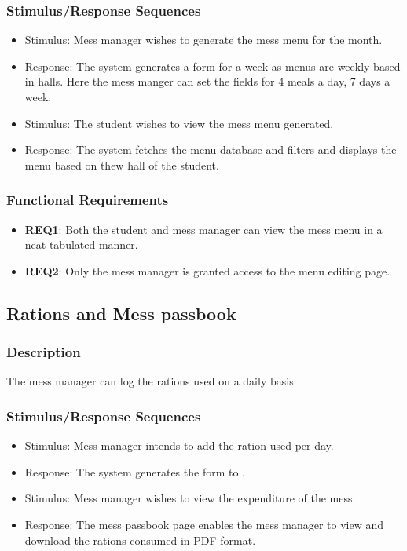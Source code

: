 \documentclass{scrreprt}
\begin{document}
\subsubsection{Stimulus/Response Sequences}
\begin{itemize}
    \item Stimulus: Mess manager wishes to generate the mess menu for the month.
    \item Response: The system generates a form for a week as menus are weekly based in halls. Here the mess manger can set the fields for 4 meals a day, 7 days a week.
\end{itemize}
\begin{itemize}
    \item Stimulus: The student wishes to view the mess menu generated.
    \item Response: The system fetches the menu database and filters and displays the menu based on thew hall of the student.
\end{itemize}

\subsubsection{Functional Requirements}
\begin{itemize}
    \item \textbf{REQ1}: Both the student and mess manager can view the mess menu in a neat tabulated manner.
    \item \textbf{REQ2}: Only the mess manager is granted access to the menu editing page.
\end{itemize}

\subsection{Rations and Mess passbook}
\subsubsection{Description}
The mess manager can log the rations used on a daily basis
\subsubsection{Stimulus/Response Sequences}
\begin{itemize}
    \item Stimulus: Mess manager intends to add the ration used per day.
    \item Response: The system generates the form to .
\end{itemize}
\begin{itemize}
    \item Stimulus: Mess manager wishes to view the expenditure of the mess.
    \item Response: The mess passbook page enables the mess manager to view and download the rations consumed in PDF format.
\end{itemize}
\end{document}
